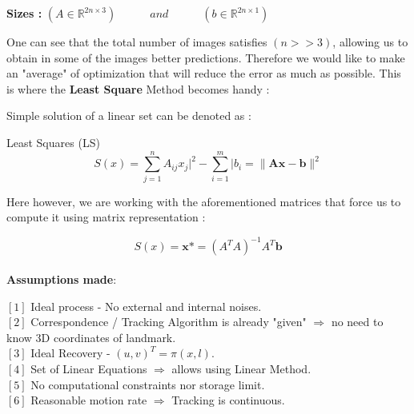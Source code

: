 \documentclass[12pt]{article}
\begin{document}
\begin{center} \textbf{Sizes :}
$(A \in \mathbb{R}^{2n \times 3}) \quad \quad \quad and \quad \quad \quad (b \in \mathbb{R}^{2n \times 1})$
\end{center}

\begin{flushleft} One can see that the total number of images satisfies $(n >> 3)$, allowing us to obtain in some of the images better predictions. Therefore we would like to make an "average" of optimization that will reduce the error as much as possible. This is where the \textbf{Least Square} Method becomes handy : 
\end{flushleft} \newpage

Simple solution of a linear set can be denoted as : \\
\begin{center} Least Squares (LS) $$S(x) = \sum_{j=1}^{n} A_{ij}x_j\bigr|^2 - \sum_{i=1}^{m}\bigl| b_i= \bigl\|\mathbf A \boldsymbol x - \textbf{b} \bigr\|^2$$\end{center}
Here however, we are working with the aforementioned matrices that force us to compute it using matrix representation :  

$$S(x) = \textbf{x*} = (A^T A)^{-1} A^T \textbf{b} $$ \\

\textbf{{\Large Assumptions made}}: \begin{flushleft}
$[1]$ Ideal process - No external and internal noises. \\
$[2]$ Correspondence / Tracking Algorithm is already "given" $\Rightarrow$ no need to know 3D coordinates of landmark.\\
$[3]$ Ideal Recovery - $(u,v)^T = \pi(x,l)$. \\
$[4]$ Set of Linear Equations $\Rightarrow$ allows using Linear Method. \\
$[5]$ No computational constraints nor storage limit. \\ 
$[6]$ Reasonable motion rate $\Rightarrow$ Tracking is continuous.

\end{flushleft}
\end{document}
